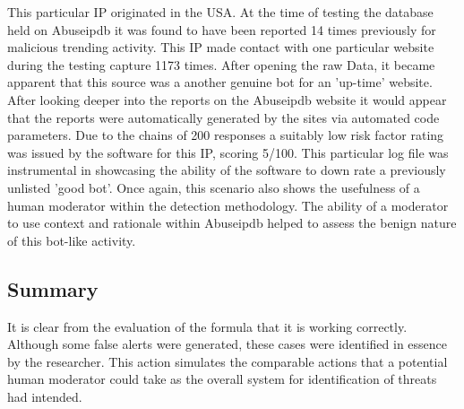 This particular IP originated in the USA. At the time of testing the database held on Abuseipdb it was found to have been reported 14 times previously for malicious trending activity. This IP made contact with one particular website during the testing capture 1173 times. After opening the raw Data, it became apparent that this source was a another genuine bot for an 'up-time' website. After looking deeper into the reports on the Abuseipdb website it would appear that the reports were automatically generated by the sites via automated code parameters. Due to the chains of 200 responses a suitably low risk factor rating was issued by the software for this IP, scoring 5/100. This particular log file was instrumental in showcasing the ability of the software to down rate a previously unlisted 'good bot'. Once again, this scenario also shows the usefulness of a human moderator within the detection methodology. The ability of a moderator to use context and rationale within Abuseipdb helped to assess the benign nature of this bot-like activity.

\subsection{Summary}

It is clear from the evaluation of the formula that it is working correctly. Although some false alerts were generated, these cases were identified in essence by the researcher. This action simulates the comparable actions that a potential human moderator could take as the overall system for identification of threats had intended.
